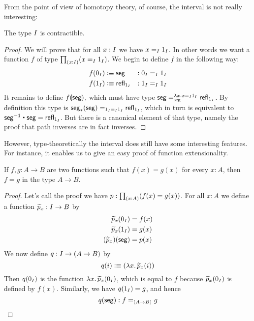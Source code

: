 From the point of view of homotopy theory, of course, the interval is not really interesting:

\begin{lem}
  The type $I$ is contractible.
\end{lem}

\begin{proof}
  We will prove that for all $x:I$ we have $x=_I1_{I}$. In other words we want a
  function $f$ of type $\prd{x:\interval}(x=_\interval\ione)$. We begin to define $f$ in the following way:
  \begin{alignat*}{2}
    f(0_{I})&\vcentcolon\equiv \mathsf{seg}  &:0_{I}&=_I1_{I}\\
    f(1_{I})&\vcentcolon\equiv \mathsf{refl}_{1_{I}} &:1_{I} &=_I1_{I}
  \end{alignat*}
  It remains to define ${f}\llparenthesis{\ensuremath{\mathsf{seg}}}\rrparenthesis$, which must have type $\mathsf{seg} =_\mathsf{seg}^{\lambda{}x.x=_I1_{I}}\mathsf{refl}_{1_{I}}$.
  By definition this type is ${\mathsf{seg}}_{*}({\mathsf{seg}})=_{1_{I}=_I1_{I}}\mathsf{refl}_{1_{I}}$, which in turn is equivalent to $\rev\seg\ct\seg=\refl\ione$.
  But there is a canonical element of that type, namely the proof that path inverses are in fact inverses.
\end{proof}

However, type-theoretically the interval does still have some interesting features.
For instance, it enables us to give an easy proof of function extensionality.

\begin{lem}\label{thm:interval-funext}
  If $f,g:A\to{}B$ are two functions such that $f(x)=g(x)$ for every $x:A$, then
  $f=g$ in the type $A\to{}B$.
\end{lem}

\begin{proof}
  Let's call the proof we have $p:\prd{x:A}(f(x)=g(x))$. For all $x:A$ we define
  a function $\widetilde{p}_x:I\to{}B$ by
  \begin{align*}
    \widetilde{p}_x(0_{I}) &= f(x) \\
    \widetilde{p}_x(1_{I}) &= g(x) \\
    {(\widetilde{p}_x)}({\mathsf{seg}}) &= p(x)
  \end{align*}
  We now define $q:I\to(A\to{}B)$ by
  \[q(i)\vcentcolon\equiv(\lambda{}x.\,\widetilde{p}_x(i))\]
  Then $q(0_{I})$ is the function $\lambda{}x.\,\widetilde{p}_x(0_{I})$, which is equal to $f$ because $\widetilde{p}_x(0_{I})$ is defined by $f(x)$.
  Similarly, we have $q(1_{I})=g$, and hence
  \[{q}({\mathsf{seg}}):f=_{(A\to{}B)}g \qedhere\]
\end{proof}


